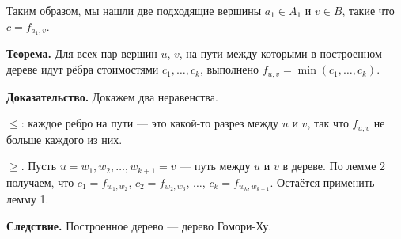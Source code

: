 Таким образом, мы нашли две подходящие вершины $a_1 \in A_1$ и $v \in B$, такие что $c = f_{a_1, v}$.

\textbf{Теорема.} Для всех пар вершин $u$, $v$, на пути между которыми в построенном дереве идут рёбра стоимостями $c_1, \dots, c_k$, выполнено $f_{u,v} = \min(c_1, \dots, c_k)$.

\textbf{Доказательство.} Докажем два неравенства.

$\le$: каждое ребро на пути --- это какой-то разрез между $u$ и $v$, так что $f_{u,v}$ не больше каждого из них.

$\ge$. Пусть $u = w_1, w_2, \dots, w_{k+1} = v$ --- путь между $u$ и $v$ в дереве.
По лемме 2 получаем, что $c_1 = f_{w_1, w_2}$, $c_2 = f_{w_2, w_3}$, $\dots$, $c_k = f_{w_k, w_{k+1}}$.
Остаётся применить лемму 1.

\textbf{Следствие.} Построенное дерево --- дерево Гомори-Ху.
